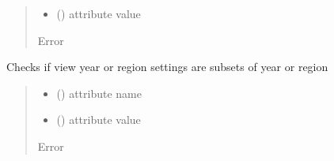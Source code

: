 \documentclass[letterpaper,10pt,english]{sphinxmanual}
\begin{document}
\begin{fulllineitems}
\begin{fulllineitems}
\begin{quote}
\begin{description}
\begin{itemize}
\item {} 
\sphinxAtStartPar
{} () \textendash{} attribute value

\end{itemize}

\sphinxAtStartPar
{} \textendash{} Error

\end{description}\end{quote}

\end{fulllineitems}


\begin{fulllineitems}
\label{\detokenize{src.common.config_setup:src.common.config_setup.Config_settings._check_res_settings}}
\pysigstartsignatures
\pysiglinewithargsret
{}
{\sphinxparamcomma {}}
{}
\pysigstopsignatures
\sphinxAtStartPar
Checks if view year or region settings are subsets of year or region
\begin{quote}\begin{description}
\begin{itemize}
\item {} 
\sphinxAtStartPar
{} () \textendash{} attribute name

\item {} 
\sphinxAtStartPar
{} () \textendash{} attribute value

\end{itemize}

\sphinxAtStartPar
{} \textendash{} Error

\end{description}\end{quote}

\end{fulllineitems}


\end{fulllineitems}
\end{document}
